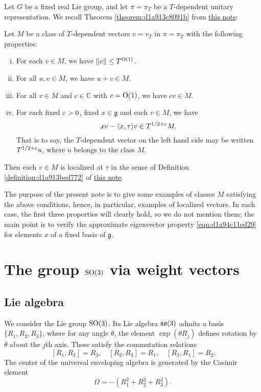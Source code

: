 \documentclass[reqno]{amsart} 
\numberwithin{equation}{section}
\begin{document}
Let $G$ be a fixed real Lie group, and let $\pi = \pi_T$ be a $T$-dependent unitary representation.  We recall Theorem \ref{theorem:d1a913c8091b} from \href{20230522T150333__microlocal-localized-vectors.pdf}{this note}:
\begin{theorem}\label{theorem:d1a94d0ddd25}
  Let $M$ be a class of $T$-dependent vectors $v = v_T$ in $\pi = \pi_T$ with the following properties:
  \begin{enumerate}[(i)]
  \item For each $v \in M$, we have $\lVert v \rVert \leq T^{\operatorname{O}(1)}$.
  \item For all $u, v \in M$, we have $u + v \in M$.
  \item For all $v \in M$ and $c \in \mathbb{C}$ with $c = \operatorname{O}(1)$, we have $c v \in M$.
  \item For each fixed $\varepsilon > 0$, fixed $x \in \mathfrak{g}$ and each $v \in M$, we have
    \begin{equation}\label{eqn:d1a94c11ed29}
      x v - \langle x, \tau  \rangle v \in T^{1/2+\varepsilon} M.
    \end{equation}
    That is to say, the $T$-dependent vector on the left hand side may be written $T^{1/2+\varepsilon} u$, where $u$ belongs to the class $M$.
  \end{enumerate}
  Then each $v \in M$ is localized at $\tau$ in the sense of Definition \ref{definition:d1a913bed772} of \href{20230522T150333__microlocal-localized-vectors.pdf}{this note}.
\end{theorem}

The purpose of the present note is to give some examples of classes $M$ satisfying the above conditions, hence, in particular, examples of localized vectors.  In each case, the first three properties will clearly hold, so we do not mention them; the main point is to verify the approximate eigenvector property \eqref{eqn:d1a94c11ed29} for elements $x$ of a fixed basis of $\mathfrak{g}$.


\section{The group $\operatorname{SO}(3)$ via weight vectors}\label{sec:d1a9162ed4bc}

\subsection{Lie algebra}\label{sec:d1a9162ece67}
We consider the Lie group $\operatorname{SO}(3)$.  Its Lie algebra $\operatorname{\mathfrak{s}\mathfrak{o}}(3)$ admits a basis $\{R_1, R_2, R_3\}$, where for any angle $\theta$, the element $\exp(\theta R_j)$ defines rotation by $\theta$ about the $j$th axis.  These satisfy the commutation relations
\begin{equation*}
   ~ [R_1,R_2] = R_3, \quad [R_2,R_3] = R_1, \quad [R_3,R_1] = R_2.
\end{equation*}
The center of the universal enveloping algebra is generated by the Casimir element
\begin{equation*}
  \Omega = -(R_1^2 + R_2^2 + R_3^2).
\end{equation*}
\end{document}
